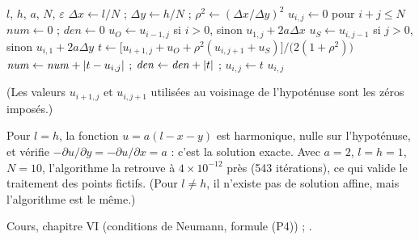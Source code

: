 \begin{algo}
  \Require $l$, $h$, $a$, $N$, $\varepsilon$
  \State $\Delta x \leftarrow l/N$ ; $\Delta y \leftarrow h/N$ ; $\rho^2 \leftarrow (\Delta x/\Delta y)^2$
  \State $u_{i,j} \leftarrow 0$ pour $i + j \le N$
  \Repeat
    \State $\mathit{num} \leftarrow 0$ ; $\mathit{den} \leftarrow 0$
        \State $u_O \leftarrow u_{i-1,j}$ si $i > 0$, sinon $u_{1,j} + 2a\Delta x$
        \State $u_S \leftarrow u_{i,j-1}$ si $j > 0$, sinon $u_{i,1} + 2a\Delta y$
        \State $t \leftarrow \bigl[u_{i+1,j} + u_O + \rho^2(u_{i,j+1} + u_S)\bigr]/\bigl(2(1+\rho^2)\bigr)$
        \State $\mathit{num} \leftarrow \mathit{num} + \left|t - u_{i,j}\right|$ ; $\mathit{den} \leftarrow \mathit{den} + \left|t\right|$ ; $u_{i,j} \leftarrow t$
      \EndFor
    \EndFor
  \Print $u_{i,j}$
\end{algo}
(Les valeurs $u_{i+1,j}$ et $u_{i,j+1}$ utilisées au voisinage de l'hypoténuse
sont les zéros imposés.)

\Verif Pour $l = h$, la fonction $u = a(l - x - y)$ est harmonique, nulle sur
l'hypoténuse, et vérifie $-\partial u/\partial y = -\partial u/\partial x = a$ :
c'est la solution exacte. Avec $a = 2$, $l = h = 1$, $N = 10$, l'algorithme
la retrouve à $4\times 10^{-12}$ près (543 itérations), ce qui valide le
traitement des points fictifs. (Pour $l \ne h$, il n'existe pas de solution
affine, mais l'algorithme est le même.)

\Refs Cours, chapitre VI (conditions de Neumann, formule (P4)) ;
.
